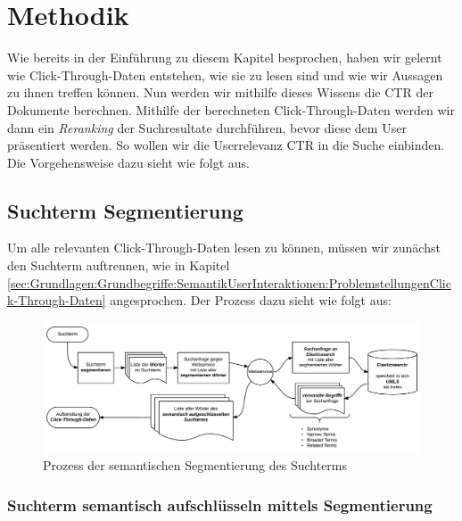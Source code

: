 
\section{Methodik}
\label{sec:Reranking:Methodik}

Wie bereits in der Einführung zu diesem Kapitel besprochen, haben wir gelernt wie Click-Through-Daten entstehen, wie sie zu lesen sind und wie wir Aussagen zu ihnen treffen können. Nun werden wir mithilfe dieses Wissens die CTR der Dokumente berechnen. Mithilfe der berechneten Click-Through-Daten werden wir dann ein \textit{Reranking} der Suchresultate durchführen, bevor diese dem User präsentiert werden. So wollen wir die Userrelevanz CTR in die Suche einbinden. Die Vorgehensweise dazu sieht wie folgt aus.

\subsection{Suchterm Segmentierung}
\label{sec:Reranking:Methodik:SuchtermSegmentierung}

Um alle relevanten Click-Through-Daten lesen zu können, müssen wir zunächst den Suchterm auftrennen, wie in Kapitel \ref{sec:Grundlagen:Grundbegriffe:SemantikUserInteraktionen:ProblemstellungenClick-Through-Daten} angesprochen. Der Prozess dazu sieht wie folgt aus:

\begin{figure}[H]
\centering
\vspace{-1em}
\caption[Prozess der semantischen Segmentierung des Suchterms]{Prozess der semantischen Segmentierung des Suchterms}
\label{fig:SemantischeSegmentierung}
\includegraphics[width=\linewidth]{gfx/SuchtermSegmentierung}
\vspace{-2em}
\end{figure} 

\subsubsection{Suchterm semantisch aufschlüsseln mittels Segmentierung}
\label{sec:Reranking:Methodik:SuchtermSegmentierung:SuchtermSegmentierung}

